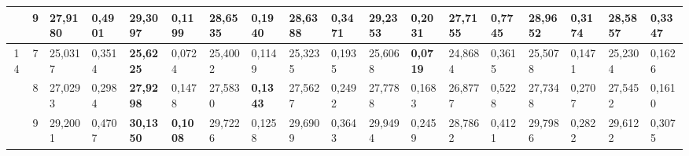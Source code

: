 \documentclass[conference]{IEEEtran}
\begin{document}
\begin{table*}[]
\begin{tabular}{|cc|ll|ll|ll|ll|ll|ll|ll|ll|}
		\multicolumn{1}{|c|}{}                    & 9          & \multicolumn{1}{l|}{27,9180}           & 0,4901                            & \multicolumn{1}{l|}{\textbf{29,3097}}  & \textbf{0,1199}                   & \multicolumn{1}{l|}{28,6535}           & 0,1940                            & \multicolumn{1}{l|}{28,6388}           & 0,3471                            & \multicolumn{1}{l|}{29,2353}           & 0,2031                            & \multicolumn{1}{l|}{27,7155}           & 0,7745                            & \multicolumn{1}{l|}{28,9652}           & 0,3174                            & \multicolumn{1}{l|}{28,5857}           & 0,3347                            \\ \hline
		\multicolumn{1}{|c|}{\multirow{3}{*}{14}} & 7          & \multicolumn{1}{l|}{25,0317}           & 0,3514                            & \multicolumn{1}{l|}{\textbf{25,6225}}  & 0,0724                            & \multicolumn{1}{l|}{25,4002}           & 0,1149                            & \multicolumn{1}{l|}{25,3235}           & 0,1935                            & \multicolumn{1}{l|}{25,6068}           & \textbf{0,0719}                   & \multicolumn{1}{l|}{24,8684}           & 0,3615                            & \multicolumn{1}{l|}{25,5078}           & 0,1471                            & \multicolumn{1}{l|}{25,2304}           & 0,1626                            \\ \cline{2-18} 
		\multicolumn{1}{|c|}{}                    & 8          & \multicolumn{1}{l|}{27,0293}           & 0,2984                            & \multicolumn{1}{l|}{\textbf{27,9298}}  & 0,1478                            & \multicolumn{1}{l|}{27,5830}           & \textbf{0,1343}                   & \multicolumn{1}{l|}{27,5627}           & 0,2492                            & \multicolumn{1}{l|}{27,7788}           & 0,1683                            & \multicolumn{1}{l|}{26,8777}           & 0,5228                            & \multicolumn{1}{l|}{27,7348}           & 0,2707                            & \multicolumn{1}{l|}{27,5452}           & 0,1610                            \\ \cline{2-18} 
		\multicolumn{1}{|c|}{}                    & 9          & \multicolumn{1}{l|}{29,2001}           & 0,4707                            & \multicolumn{1}{l|}{\textbf{30,1350}}  & \textbf{0,1008}                   & \multicolumn{1}{l|}{29,7226}           & 0,1258                            & \multicolumn{1}{l|}{29,6909}           & 0,3643                            & \multicolumn{1}{l|}{29,9494}           & 0,2459                            & \multicolumn{1}{l|}{28,7862}           & 0,4121                            & \multicolumn{1}{l|}{29,7986}           & 0,2822                            & \multicolumn{1}{l|}{29,6122}           & 0,3075                            \\ \hline

\end{tabular}
\end{table*}
\end{document}
